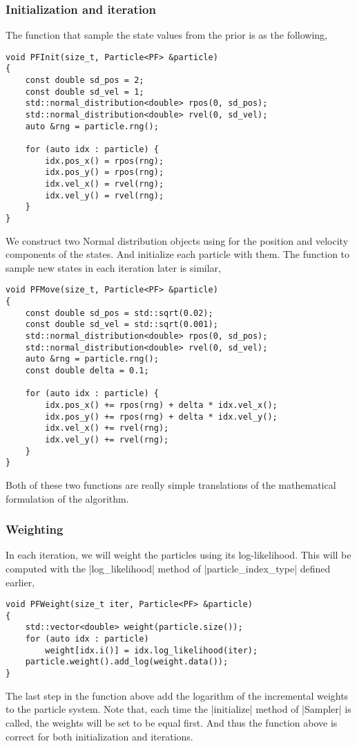 \subsubsection{Initialization and iteration}

The function that sample the state values from the prior is as the following,
\begin{verbatim}
void PFInit(size_t, Particle<PF> &particle)
{
    const double sd_pos = 2;
    const double sd_vel = 1;
    std::normal_distribution<double> rpos(0, sd_pos);
    std::normal_distribution<double> rvel(0, sd_vel);
    auto &rng = particle.rng();

    for (auto idx : particle) {
        idx.pos_x() = rpos(rng);
        idx.pos_y() = rpos(rng);
        idx.vel_x() = rvel(rng);
        idx.vel_y() = rvel(rng);
    }
}
\end{verbatim}
We construct two Normal distribution objects using for the position and
velocity components of the states. And initialize each particle with them. The
function to sample new states in each iteration later is similar,
\begin{verbatim}
void PFMove(size_t, Particle<PF> &particle)
{
    const double sd_pos = std::sqrt(0.02);
    const double sd_vel = std::sqrt(0.001);
    std::normal_distribution<double> rpos(0, sd_pos);
    std::normal_distribution<double> rvel(0, sd_vel);
    auto &rng = particle.rng();
    const double delta = 0.1;

    for (auto idx : particle) {
        idx.pos_x() += rpos(rng) + delta * idx.vel_x();
        idx.pos_y() += rpos(rng) + delta * idx.vel_y();
        idx.vel_x() += rvel(rng);
        idx.vel_y() += rvel(rng);
    }
}
\end{verbatim}
Both of these two functions are really simple translations of the mathematical
formulation of the algorithm.

\subsubsection{Weighting}

In each iteration, we will weight the particles using its log-likelihood. This
will be computed with the |log_likelihood| method of |particle_index_type|
defined earlier,
\begin{verbatim}
void PFWeight(size_t iter, Particle<PF> &particle)
{
    std::vector<double> weight(particle.size());
    for (auto idx : particle)
        weight[idx.i()] = idx.log_likelihood(iter);
    particle.weight().add_log(weight.data());
}
\end{verbatim}
The last step in the function above add the logarithm of the incremental
weights to the particle system. Note that, each time the |initialize| method of
|Sampler| is called, the weights will be set to be equal first. And thus the
function above is correct for both initialization and iterations.

